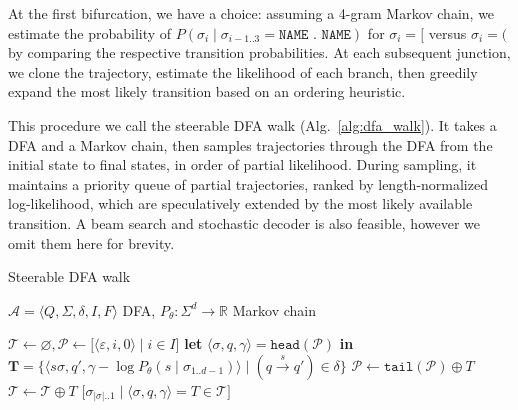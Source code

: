 \documentclass[sigplan,acmsmall,nonacm,screen]{acmart}\settopmatter{printfolios=false,printccs=false,printacmref=false}
\begin{document}
At the first bifurcation, we have a choice: assuming a 4-gram Markov chain, we estimate the probability of $P(\sigma_i \mid \sigma_{i-1..3}=\texttt{NAME . NAME})$ for $\sigma_i = \texttt{[}$ versus $\sigma_i = \texttt{(}$ by comparing the respective transition probabilities. At each subsequent junction, we clone the trajectory, estimate the likelihood of each branch, then greedily expand the most likely transition based on an ordering heuristic.

This procedure we call the steerable DFA walk (Alg.~\ref{alg:dfa_walk}). It takes a DFA and a Markov chain, then samples trajectories through the DFA from the initial state to final states, in order of partial likelihood. During sampling, it maintains a priority queue of partial trajectories, ranked by length-normalized log-likelihood, which are speculatively extended by the most likely available transition. A beam search and stochastic decoder is also feasible, however we omit them here for brevity.

\begin{algorithm}[H]
\caption{Steerable DFA walk}
\label{alg:dfa_walk}
\begin{algorithmic}[1]
\Require $\mathcal{A} = \langle Q, \Sigma, \delta, I, F\rangle$ DFA, $P_\theta: \Sigma^d \rightarrow \mathbb{R}$ Markov chain

\State $\mathcal{T} \gets \varnothing, \mathcal{P} \gets \big[\langle \varepsilon, i, 0\rangle \mid i \in I\big]$ 
\Repeat
\State \textbf{let }$\langle \sigma, q, \gamma \rangle = \texttt{head}(\mathcal{P})$ \textbf{in}
\State {}$\mathbf{T} = \big\{\langle s\sigma, q', \gamma - \log P_\theta(s \mid \sigma_{1..d-1}) \rangle\mid (q\overset{s}{\rightarrow}q') \in \delta\big\}$ 
\State $\mathcal{P} \gets \texttt{tail}(\mathcal{P}) \oplus T$ 
\EndIf
{}
\State $\mathcal{T} \gets \mathcal{T} \oplus T$ 
\EndIf
\EndFor
{}
\State \Return $\big[\sigma_{|\sigma|..1} \mid \langle \sigma, q, \gamma \rangle = T \in \mathcal{T}\big]$ 
\end{algorithmic}
\end{algorithm}\vspace{-0.2cm}
\end{document}

